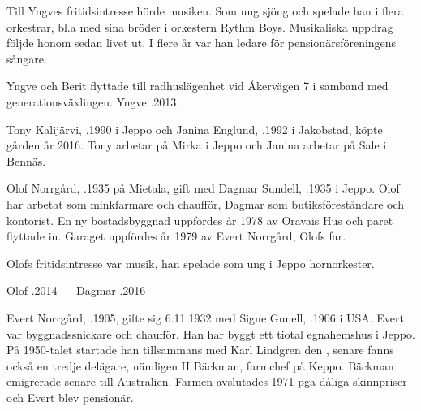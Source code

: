 Till Yngves fritidsintresse hörde musiken. Som ung sjöng och spelade han i flera orkestrar, bl.a med sina bröder i orkestern Rythm Boys. Musikaliska uppdrag följde honom sedan livet ut. I flere år var han ledare för pensionärsföreningens sångare.

Yngve och Berit flyttade till radhuslägenhet vid Åkervägen 7 i samband med generationsväxlingen. Yngve .2013.






Tony Kalijärvi, .1990 i Jeppo och Janina Englund, .1992 i Jakobstad, köpte gården år 2016. Tony arbetar på Mirka i Jeppo och Janina arbetar på Sale i Bennäs.


Olof Norrgård, .1935 på Mietala, gift med Dagmar Sundell, .1935  i Jeppo. Olof har arbetat som minkfarmare och chaufför, Dagmar som butiksföreståndare och kontorist. En ny bostadsbyggnad uppfördes år 1978 av Oravais Hus och paret flyttade in. Garaget uppfördes år 1979 av Evert Norrgård, Olofs far.

Olofs fritidsintresse var musik, han spelade som ung i Jeppo hornorkester.

Olof .2014  ---  Dagmar .2016






Evert Norrgård, .1905, gifte sig 6.11.1932 med Signe Gunell, .1906 i USA. Evert var byggnadssnickare och chaufför. Han har byggt ett tiotal egnahemshus i Jeppo. På 1950-talet startade han tillsammans med Karl Lindgren den , senare fanns också en tredje delägare, nämligen H Bäckman, farmchef på Keppo. Bäckman emigrerade senare till Australien. Farmen avslutades 1971 pga dåliga skinnpriser och Evert blev pensionär.

